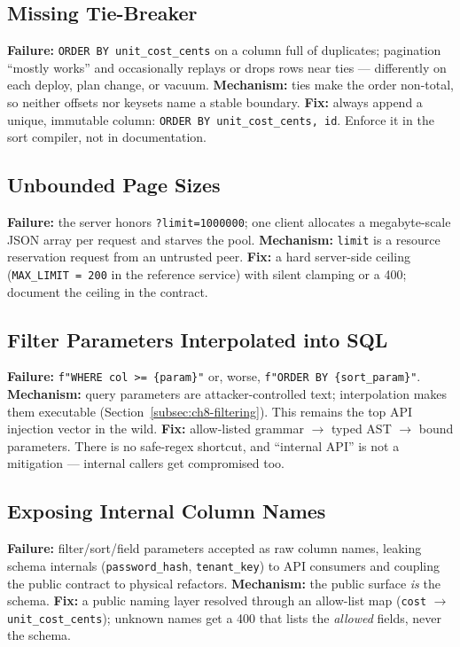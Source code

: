 \subsection{Missing Tie-Breaker}
\textbf{Failure:} \texttt{ORDER BY unit\_cost\_cents} on a column full of
duplicates; pagination ``mostly works'' and occasionally replays or drops
rows near ties --- differently on each deploy, plan change, or vacuum.
\textbf{Mechanism:} ties make the order non-total, so neither offsets nor
keysets name a stable boundary. \textbf{Fix:} always append a unique,
immutable column: \texttt{ORDER BY unit\_cost\_cents, id}. Enforce it in the
sort compiler, not in documentation.

\subsection{Unbounded Page Sizes}
\textbf{Failure:} the server honors \texttt{?limit=1000000}; one client
allocates a megabyte-scale JSON array per request and starves the pool.
\textbf{Mechanism:} \texttt{limit} is a resource reservation request from an
untrusted peer. \textbf{Fix:} a hard server-side ceiling
(\texttt{MAX\_LIMIT = 200} in the reference service) with silent clamping or
a 400; document the ceiling in the contract.

\subsection{Filter Parameters Interpolated into SQL}
\textbf{Failure:} \texttt{f"WHERE col >= \{param\}"} or, worse,
\texttt{f"ORDER BY \{sort\_param\}"}. \textbf{Mechanism:} query parameters
are attacker-controlled text; interpolation makes them executable
(Section~\ref{subsec:ch8-filtering}). This remains the top API injection
vector in the wild. \textbf{Fix:} allow-listed grammar $\to$ typed AST
$\to$ bound parameters. There is no safe-regex shortcut, and ``internal
API'' is not a mitigation --- internal callers get compromised too.

\subsection{Exposing Internal Column Names}
\textbf{Failure:} filter/sort/field parameters accepted as raw column names,
leaking schema internals (\texttt{password\_hash}, \texttt{tenant\_key}) to
API consumers and coupling the public contract to physical refactors.
\textbf{Mechanism:} the public surface \emph{is} the schema. \textbf{Fix:} a
public naming layer resolved through an allow-list map
(\texttt{cost} $\to$ \texttt{unit\_cost\_cents}); unknown names get a 400
that lists the \emph{allowed} fields, never the schema.

